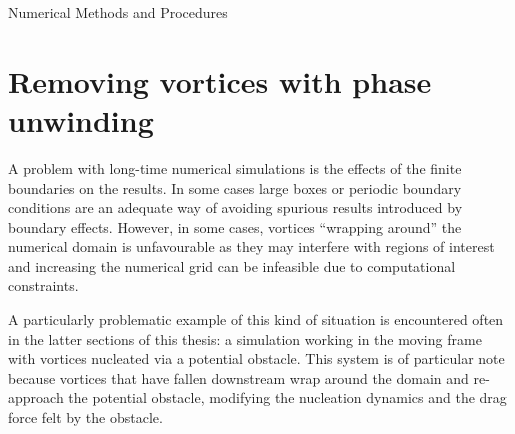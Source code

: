 \begin{chapter}{\label{cha:numerics}Numerical Methods and Procedures}
\section{\label{section:vortexremoval} Removing vortices with phase unwinding}
A problem with long-time numerical simulations is the effects of the finite boundaries on the results. In some cases large boxes or periodic boundary conditions are an adequate way of avoiding spurious results introduced by boundary effects. However, in some cases, vortices ``wrapping around'' the numerical domain is unfavourable as they may interfere with regions of interest and increasing the numerical grid can be infeasible due to computational constraints.

A particularly problematic example of this kind of situation is encountered often in the latter sections of this thesis: a simulation working in the moving frame with vortices nucleated via a potential obstacle. This system is of particular note because vortices that have fallen downstream wrap around the domain and re-approach the potential obstacle, modifying the nucleation dynamics and the drag force felt by the obstacle.


\end{chapter}
